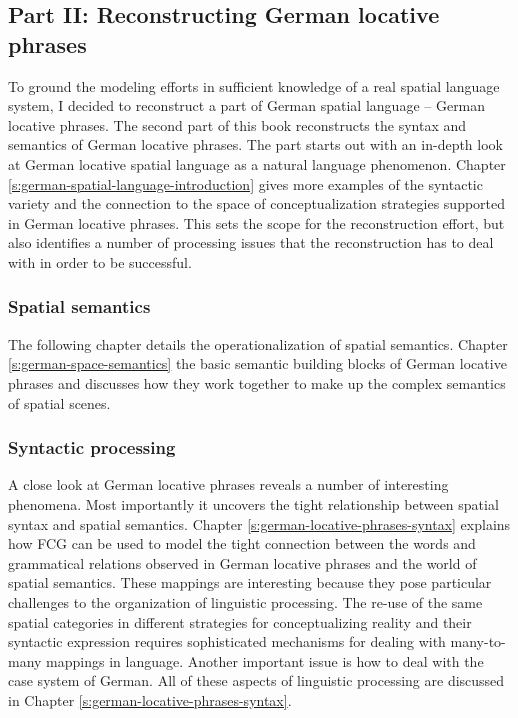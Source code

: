 \subsection{Part II: Reconstructing German locative phrases}
To ground the modeling efforts in sufficient knowledge of a real spatial language system, 
I decided to reconstruct a part of German spatial language -- German locative 
phrases. The second part of this book reconstructs the syntax and semantics 
of German locative phrases. The part starts out with an in-depth look at
German locative spatial language as a natural language phenomenon. Chapter
\ref{s:german-spatial-language-introduction} gives more examples of the syntactic variety and the connection to the
space of conceptualization strategies supported in German locative phrases.
This sets the scope for the reconstruction effort, but also identifies a number
of processing issues that the reconstruction has to deal with in order to be successful.

\subsubsection{Spatial semantics}
The following chapter details the operationalization of spatial semantics. 
Chapter \ref{s:german-space-semantics} the basic semantic building blocks of German locative phrases
and discusses how they work together to make up the complex 
semantics of spatial scenes.  

\subsubsection{Syntactic processing}
A close look at German locative phrases reveals a number of interesting phenomena.
Most importantly it uncovers the tight relationship between spatial 
syntax and spatial semantics. Chapter \ref{s:german-locative-phrases-syntax} 
explains how FCG can be used 
to model the tight connection between the words and grammatical 
relations observed in German locative phrases and the world of spatial semantics.
These mappings are interesting because they pose particular challenges to
the organization of linguistic processing. The re-use of the same spatial categories
in different strategies for conceptualizing reality and their syntactic expression
requires sophisticated mechanisms for dealing with many-to-many mappings 
in language. Another important issue is how to deal with the case
system of German. All of these aspects of linguistic processing are
discussed in Chapter \ref{s:german-locative-phrases-syntax}.

